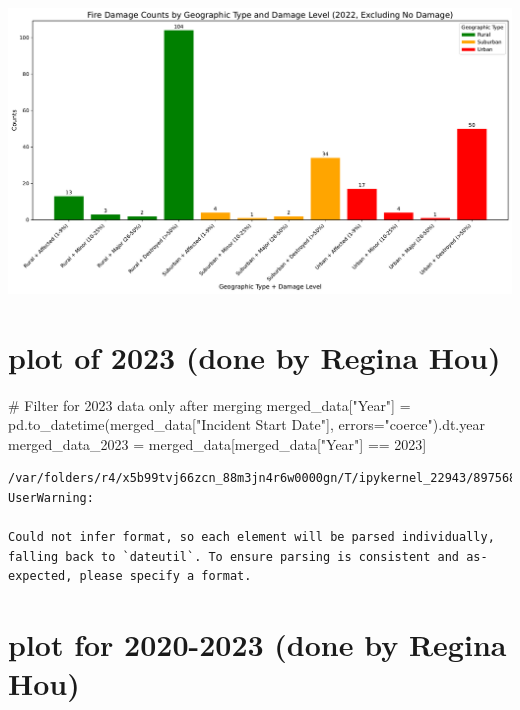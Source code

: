 \documentclass[
  letterpaper,
  DIV=11,
  numbers=noendperiod]{scrartcl}
\newenvironment{Shaded}{\begin{snugshade}}{\end{snugshade}}
\newcommand{\CommentTok}[1]{\textcolor[rgb]{0.37,0.37,0.37}{#1}}
\newcommand{\DecValTok}[1]{\textcolor[rgb]{0.68,0.00,0.00}{#1}}
\newcommand{\NormalTok}[1]{\textcolor[rgb]{0.00,0.23,0.31}{#1}}
\newcommand{\OperatorTok}[1]{\textcolor[rgb]{0.37,0.37,0.37}{#1}}
\newcommand{\StringTok}[1]{\textcolor[rgb]{0.13,0.47,0.30}{#1}}
\begin{document}
\includegraphics{Final Code_files/figure-pdf/cell-16-output-1.pdf}

\section{plot of 2023 (done by Regina
Hou)}\label{plot-of-2023-done-by-regina-hou}

\begin{Shaded}
\begin{Highlighting}[]
\CommentTok{\# Filter for 2023 data only after merging}
\NormalTok{merged\_data[}\StringTok{"Year"}\NormalTok{] }\OperatorTok{=}\NormalTok{ pd.to\_datetime(merged\_data[}\StringTok{"Incident Start Date"}\NormalTok{], errors}\OperatorTok{=}\StringTok{"coerce"}\NormalTok{).dt.year}
\NormalTok{merged\_data\_2023 }\OperatorTok{=}\NormalTok{ merged\_data[merged\_data[}\StringTok{"Year"}\NormalTok{] }\OperatorTok{==} \DecValTok{2023}\NormalTok{]}
\end{Highlighting}
\end{Shaded}

\begin{verbatim}
/var/folders/r4/x5b99tvj66zcn_88m3jn4r6w0000gn/T/ipykernel_22943/897568859.py:2: UserWarning:

Could not infer format, so each element will be parsed individually, falling back to `dateutil`. To ensure parsing is consistent and as-expected, please specify a format.
\end{verbatim}

\section{plot for 2020-2023 (done by Regina
Hou)}\label{plot-for-2020-2023-done-by-regina-hou}
\end{document}
